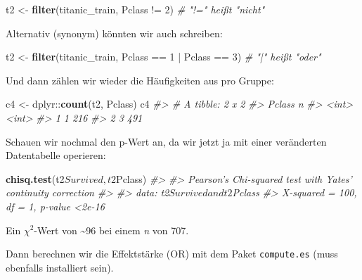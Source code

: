 \documentclass[12pt,ngerman,]{book}
\makeatletter
\newenvironment{Shaded}{\begin{snugshade}}{\end{snugshade}}
\newcommand{\KeywordTok}[1]{\textcolor[rgb]{0.13,0.29,0.53}{\textbf{{#1}}}}
\newcommand{\DecValTok}[1]{\textcolor[rgb]{0.00,0.00,0.81}{{#1}}}
\newcommand{\StringTok}[1]{\textcolor[rgb]{0.31,0.60,0.02}{{#1}}}
\newcommand{\CommentTok}[1]{\textcolor[rgb]{0.56,0.35,0.01}{\textit{{#1}}}}
\newcommand{\NormalTok}[1]{{#1}}
\newenvironment{kframe}{%
\medskip{}
\setlength{\fboxsep}{.8em}
 \def\at@end@of@kframe{}%
 \ifinner\ifhmode%
  \def\at@end@of@kframe{\end{minipage}}%
  \begin{minipage}{\columnwidth}%
 \fi\fi%
 \def\FrameCommand##1{\hskip\@totalleftmargin \hskip-\fboxsep
 \colorbox{shadecolor}{##1}\hskip-\fboxsep
     \hskip-\linewidth \hskip-\@totalleftmargin \hskip\columnwidth}%
 \MakeFramed {\advance\hsize-\width
   \@totalleftmargin\z@ \linewidth\hsize
   \@setminipage}}%
 {\par\unskip\endMakeFramed%
 \at@end@of@kframe}
\renewenvironment{Shaded}{\begin{kframe}}{\end{kframe}}
\theoremstyle{definition}
\theoremstyle{definition}
\theoremstyle{remark}
\makeatother
\begin{document}
\begin{Shaded}
\begin{Highlighting}[]
\NormalTok{t2 <-}\StringTok{ }\KeywordTok{filter}\NormalTok{(titanic_train, Pclass !=}\StringTok{ }\DecValTok{2}\NormalTok{)  }\CommentTok{# "!=" heißt "nicht"}
\end{Highlighting}
\end{Shaded}

Alternativ (synonym) könnten wir auch schreiben:

\begin{Shaded}
\begin{Highlighting}[]
\NormalTok{t2 <-}\StringTok{ }\KeywordTok{filter}\NormalTok{(titanic_train, Pclass ==}\StringTok{ }\DecValTok{1} \NormalTok{|}\StringTok{ }\NormalTok{Pclass ==}\StringTok{ }\DecValTok{3}\NormalTok{)  }\CommentTok{# "|" heißt "oder"}
\end{Highlighting}
\end{Shaded}

Und dann zählen wir wieder die Häufigkeiten aus pro Gruppe:

\begin{Shaded}
\begin{Highlighting}[]
\NormalTok{c4 <-}\StringTok{ }\NormalTok{dplyr::}\KeywordTok{count}\NormalTok{(t2, Pclass)}
\NormalTok{c4}
\CommentTok{#> # A tibble: 2 x 2}
\CommentTok{#>   Pclass     n}
\CommentTok{#>    <int> <int>}
\CommentTok{#> 1      1   216}
\CommentTok{#> 2      3   491}
\end{Highlighting}
\end{Shaded}

Schauen wir nochmal den p-Wert an, da wir jetzt ja mit einer veränderten
Datentabelle operieren:

\begin{Shaded}
\begin{Highlighting}[]
\KeywordTok{chisq.test}\NormalTok{(t2$Survived, t2$Pclass)}
\CommentTok{#> }
\CommentTok{#>  Pearson's Chi-squared test with Yates' continuity correction}
\CommentTok{#> }
\CommentTok{#> data:  t2$Survived and t2$Pclass}
\CommentTok{#> X-squared = 100, df = 1, p-value <2e-16}
\end{Highlighting}
\end{Shaded}

Ein \(\chi^2\)-Wert von \textasciitilde{}96 bei einem \emph{n} von 707.

Dann berechnen wir die Effektstärke (OR) mit dem Paket
\texttt{compute.es} (muss ebenfalls installiert sein).
\end{document}
